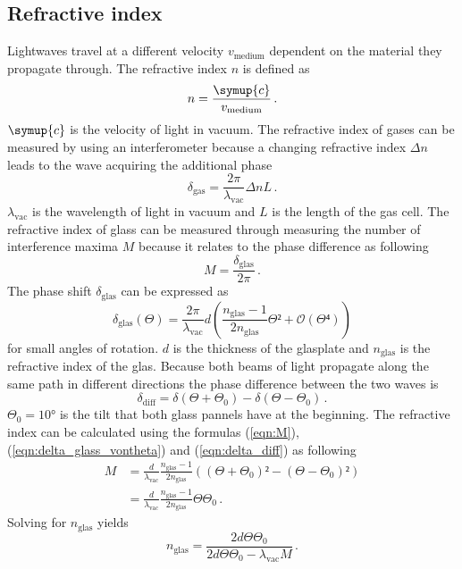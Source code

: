  \subsection{Refractive index}
 Lightwaves travel at a different velocity $v_{\text{medium}}$ dependent on the material they propagate through. 
 The refractive index $n$ is defined as 
 \begin{equation}
    n = \frac{\symup{c}}{v_{\text{medium}}} \, .
 \end{equation}
 $\symup{c}$ is the velocity of light in vacuum. 
 The refractive index of gases can be measured by using an interferometer because a changing refractive 
 index $\Delta n$ leads to the wave acquiring the additional phase 
 \begin{equation}
    \delta_{\text{gas}} = \frac{2 \pi}{\lambda_{\text{vac}}} \Delta n L \, . 
 \end{equation}
 $\lambda_{\text{vac}}$ is the wavelength of light in vacuum and $L$ is the length of the gas cell. 
 The refractive index of glass can be measured through measuring the number of interference maxima $M$
 because it relates to the phase difference as following 
 \begin{equation}
    M = \frac{\delta_{\text{glas}}}{2\pi} \label{eqn:M} \, .
 \end{equation}
 The phase shift $\delta_{\text{glas}}$ can be expressed as 
 \begin{equation}
    \delta_{\text{glas}}(\Theta) = \frac{2 \pi}{\lambda_{\text{vac}}} d \left( \frac{n_{\text{glas}}-1}{2n_{\text{glas}}} \Theta² + \mathcal{O}(\Theta⁴)\right) 
    \label{eqn:delta_glass_vontheta}
 \end{equation}
 for small angles of rotation. 
 $d$ is the thickness of the glasplate and $n_{\text{glas}}$ is the refractive index of the glas. 
 Because both beams of light propagate along the same path in different directions the phase difference between the two waves is 
 \begin{equation}
    \delta_{\text{diff}} = \delta(\Theta + \Theta_0) - \delta(\Theta - \Theta_0) \label{eqn:delta_diff} \, .
 \end{equation}
 $\Theta_0 = 10°$ is the tilt that both glass pannels have at the beginning. The refractive index can be calculated using 
 the formulas (\ref{eqn:M}), (\ref{eqn:delta_glass_vontheta}) and (\ref{eqn:delta_diff}) as following 
 \begin{align*}
    M &= \frac{d}{\lambda_{\text{vac}}} \frac{n_{\text{glas}}-1}{2n_{\text{glas}}} \left( (\Theta + \Theta_0)² - (\Theta - \Theta_0)²\right) \\
    &= \frac{d}{\lambda_{\text{vac}}} \frac{n_{\text{glas}}-1}{2n_{\text{glas}}} \Theta \Theta_0    
    \, . 
 \end{align*}
 Solving for $n_{\text{glas}}$ yields 
 \begin{equation}
    n_{\text{glas}} = \frac{2d \Theta \Theta_0}{2d \Theta \Theta_0 - \lambda_{\text{vac}}M} \, .
 \end{equation}